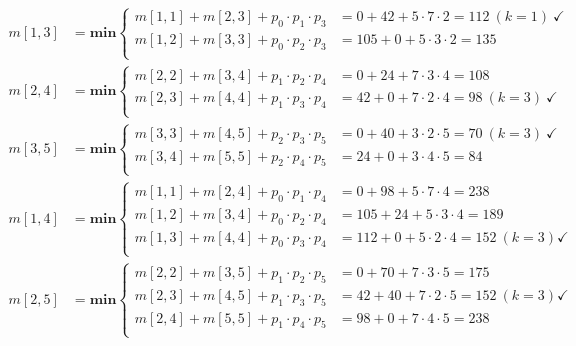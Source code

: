 \documentclass[a4paper]{article}
\begin{document}
\begin{align*}
  m[1,3] & =\textbf{min}\left\{\begin{array}{cl}
      m[1,1] + m[2,3] + p_0\cdot p_1 \cdot p_3 &= 0 + 42 + 5 \cdot 7 \cdot 2 = 112\ (k = 1)\ \checkmark\\
      m[1,2] + m[3,3] + p_0\cdot p_2 \cdot p_3 &= 105 + 0 + 5 \cdot 3 \cdot 2 = 135 \\
  \end{array}\right. \\
  m[2,4] & =\textbf{min}\left\{\begin{array}{cl}
      m[2,2] + m[3,4] + p_1\cdot p_2 \cdot p_4 &= 0 + 24 + 7 \cdot 3 \cdot 4 = 108\ \\
      m[2,3] + m[4,4] + p_1\cdot p_3 \cdot p_4 &= 42 + 0 + 7 \cdot 2 \cdot 4 = 98\ (k = 3)\ \checkmark\\
  \end{array}\right. \\
  m[3,5] & =\textbf{min}\left\{\begin{array}{cl}
      m[3,3] + m[4,5] + p_2\cdot p_3 \cdot p_5 &= 0 + 40 + 3 \cdot 2 \cdot 5 = 70\ (k = 3)\ \checkmark\\
      m[3,4] + m[5,5] + p_2\cdot p_4 \cdot p_5 &= 24 + 0 + 3 \cdot 4 \cdot 5 = 84\\
  \end{array}\right. \\
  m[1,4] & =\textbf{min}\left\{\begin{array}{cl}
      m[1,1] + m[2,4] + p_0\cdot p_1 \cdot p_4 &= 0 + 98 + 5 \cdot 7 \cdot 4 = 238 \\
      m[1,2] + m[3,4] + p_0\cdot p_2 \cdot p_4 &= 105 + 24 + 5 \cdot 3 \cdot 4 = 189\\
      m[1,3] + m[4,4] + p_0\cdot p_3 \cdot p_4 &= 112 + 0 + 5 \cdot 2 \cdot 4 = 152\ (k= 3)\checkmark\\
  \end{array}\right. \\
  m[2,5] & =\textbf{min}\left\{\begin{array}{cl}
      m[2,2] + m[3,5] + p_1\cdot p_2 \cdot p_5 &= 0 + 70 + 7 \cdot 3 \cdot 5 = 175 \\
      m[2,3] + m[4,5] + p_1\cdot p_3 \cdot p_5 &= 42 + 40 + 7 \cdot 2 \cdot 5 = 152\ (k = 3)\checkmark\\
      m[2,4] + m[5,5] + p_1\cdot p_4 \cdot p_5 &= 98 + 0 + 7 \cdot 4 \cdot 5 = 238\\
  \end{array}\right. \\

\end{align*}
\end{document}
